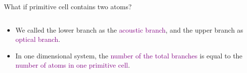\documentclass{beamer}
\begin{document}
\begin{frame}{What if primitive cell contains two atoms?}
\begin{columns}
\begin{column}{0.65\textwidth}
\begin{block}{}
\begin{itemize}
        \item We called the lower branch as the \textcolor{purple}{acoustic branch}, and the upper branch as \textcolor{purple}{optical branch}.
        \item In one dimensional system, the \textcolor{purple}{number of the total branches} is equal to the \textcolor{purple}{number of atoms in one primitive cell}.
      \end{itemize}\end{block}
    \end{column}
  \end{columns}
\end{frame}

\end{document}

